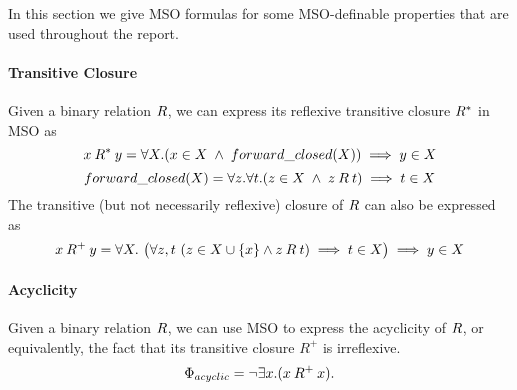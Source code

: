 
In this section we give MSO formulas for some MSO-definable properties that are used throughout the report.

\paragraph*{Transitive Closure}
Given a binary relation $\mathbin{R}$, we can express its reflexive transitive closure $\mathbin{R}^*$ in MSO as
\[
x \mathbin{R}^* y = \forall X.(x \in X \;\wedge\; forward\_closed(X)) \implies y \in X
\]
\[
forward\_closed(X) = \forall z.\forall t.(z \in X \;\wedge\; z \mathbin{R} t) \implies t \in X
\]
The transitive (but not necessarily reflexive) 
closure of $\mathbin{R}$ can also be expressed as
\[
    x \mathbin{R}^+ y = \forall X.\ \big(
        \forall z,t\ (z\in X\cup\{x\}\wedge z \mathbin{R} t)\implies t \in X\big) \implies y\in X
\]
        
\paragraph*{Acyclicity} 

Given a binary relation $\mathbin{R}$, we can use MSO to express the 
acyclicity of $\mathbin{R}$,
or equivalently, the fact that its transitive closure
$R^+$ is irreflexive.
\[
\Phi_{acyclic} =  \neg \exists x.(x \mathbin{R}^+ x).   
\]